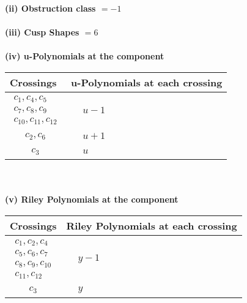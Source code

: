 \documentclass[1p]{elsarticle_modified}
\theoremstyle{definition}
\begin{document}
\flushleft \textbf{(ii) Obstruction class $= -1$}\\~\\
\flushleft \textbf{(iii) Cusp Shapes $= 6$}\\~\\
\newpage\renewcommand{\arraystretch}{1}
\flushleft \textbf{(iv) u-Polynomials at the component}\newline \\
\begin{tabular}{m{50pt}|m{274pt}}
Crossings & \hspace{64pt}u-Polynomials at each crossing \\
\hline $$\begin{aligned}c_{1},c_{4},c_{5}\\c_{7},c_{8},c_{9}\\c_{10},c_{11},c_{12}\end{aligned}$$&$\begin{aligned}
&u-1
\end{aligned}$\\
\hline $$\begin{aligned}c_{2},c_{6}\end{aligned}$$&$\begin{aligned}
&u+1
\end{aligned}$\\
\hline $$\begin{aligned}c_{3}\end{aligned}$$&$\begin{aligned}
&u
\end{aligned}$\\
\hline
\end{tabular}\\~\\
\newpage\renewcommand{\arraystretch}{1}
\flushleft \textbf{(v) Riley Polynomials at the component}\newline \\
\begin{tabular}{m{50pt}|m{274pt}}
Crossings & \hspace{64pt}Riley Polynomials at each crossing \\
\hline $$\begin{aligned}c_{1},c_{2},c_{4}\\c_{5},c_{6},c_{7}\\c_{8},c_{9},c_{10}\\c_{11},c_{12}\end{aligned}$$&$\begin{aligned}
&y-1
\end{aligned}$\\
\hline $$\begin{aligned}c_{3}\end{aligned}$$&$\begin{aligned}
&y
\end{aligned}$\\
\hline
\end{tabular}\\~\\
\end{document}
